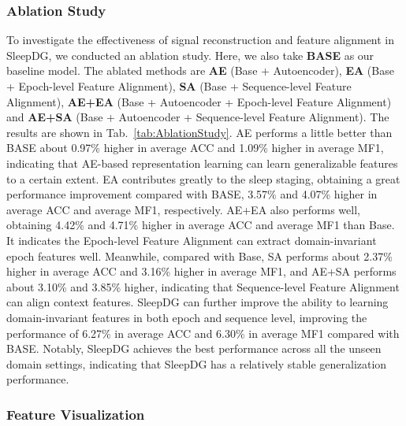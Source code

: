 \documentclass[letterpaper]{article} %
\begin{document}


	\subsubsection{Ablation Study}

	To investigate the effectiveness of signal reconstruction and feature alignment in SleepDG, we conducted an ablation study.
	Here, we also take \textbf{BASE} as our baseline model.
	The ablated methods are
	\textbf{AE} (Base + Autoencoder),
	\textbf{EA} (Base + Epoch-level Feature Alignment),
	\textbf{SA} (Base + Sequence-level Feature Alignment),
	\textbf{AE+EA} (Base + Autoencoder + Epoch-level Feature Alignment)
	and \textbf{AE+SA} (Base + Autoencoder + Sequence-level Feature Alignment).
	The results are shown in Tab.~\ref{tab:AblationStudy}. AE performs a little better than BASE about 0.97\% higher in average ACC and 1.09\% higher in average MF1, indicating that AE-based representation learning can learn generalizable features to a certain extent.
	EA contributes greatly to the sleep staging, obtaining a great performance improvement compared with BASE, 3.57\% and 4.07\% higher in average ACC and average MF1, respectively.
	AE+EA also performs well, obtaining 4.42\% and 4.71\% higher in average ACC and average MF1 than Base.
	It indicates the Epoch-level Feature Alignment can extract domain-invariant epoch features well.
	Meanwhile, compared with Base, SA performs about 2.37\% higher in average ACC and 3.16\% higher in average MF1, and AE+SA performs about 3.10\% and 3.85\% higher, indicating that Sequence-level Feature Alignment can align context features.
	SleepDG can further improve the ability to learning domain-invariant features in both epoch and sequence level, improving the performance of 6.27\% in average ACC and 6.30\% in average MF1 compared with BASE.
	Notably, SleepDG achieves the best performance across all the unseen domain settings, indicating that SleepDG has a relatively stable generalization performance.



	\subsubsection{Feature Visualization}
\end{document}
